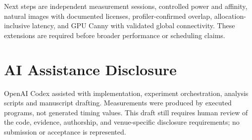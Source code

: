 \documentclass[conference]{IEEEtran}
\begin{document}
Next steps are independent measurement sessions, controlled power and affinity, natural images with documented licenses, profiler-confirmed overlap, allocation-inclusive latency, and GPU Canny with validated global connectivity. These extensions are required before broader performance or scheduling claims.

\section*{AI Assistance Disclosure}
OpenAI Codex assisted with implementation, experiment orchestration, analysis scripts and manuscript drafting. Measurements were produced by executed programs, not generated timing values. This draft still requires human review of the code, evidence, authorship, and venue-specific disclosure requirements; no submission or acceptance is represented.


\end{document}

